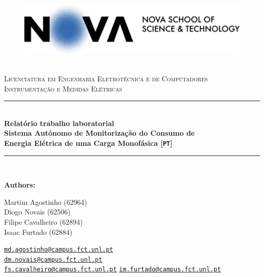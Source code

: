 \documentclass[12pt]{article}
\newcommand{\HRule}{\rule{\linewidth}{0.5mm}} %
\begin{document}
\begin{center}
    \begin{figure}
        \vspace{-1.0cm}
        \includegraphics[scale = 1, left]{NovaFct.png} %
    \end{figure}

    \mbox{}\\[2.0cm]
    \textsc{\Huge Licenciatura em Engenharia Eletrotécnica e de Computadores}\\[2.5cm]
    \textsc{\LARGE Instrumentação e Medidas Elétricas}\\[2.0cm]
    \HRule\\[0.4cm]
    {\large \bf { 
        Relatório trabalho laboratorial\\
        Sistema Autónomo de Monitorização do Consumo de\\
        Energia Elétrica de uma Carga Monofásica 
    }[\texttt{PT}]}\\[0.2cm]
    \HRule\\[1.5cm]
\end{center}

\begin{flushleft}
    \textbf{Authors:}
\end{flushleft}

\begin{center}
    \begin{minipage}{0.5\textwidth}
        \begin{flushleft}
            Martim Agostinho (62964)\\
            Diogo Novais (62506)\\
            Filipe Cavalheiro (62894)\\
            Isaac Furtado (62884)
        \end{flushleft}
    \end{minipage}%
    \begin{minipage}{0.5\textwidth}
        \begin{flushright}
            \href{mailto:md.agostinho@campus.fct.unl.pt}{\texttt{md.agostinho@campus.fct.unl.pt}}\\
            \href{mailto:dm.novais@campus.fct.unl.pt}{\texttt{dm.novais@campus.fct.unl.pt}}\\
            \href{mailto:fs.cavalheiro@campus.fct.unl.pt}{\texttt{fs.cavalheiro@campus.fct.unl.pt}}
            \href{mailto:im.furtado@campus.fct.unl.pt}{\texttt{im.furtado@campus.fct.unl.pt}}
        \end{flushright}
    \end{minipage}
\end{center}
    
\end{document}
